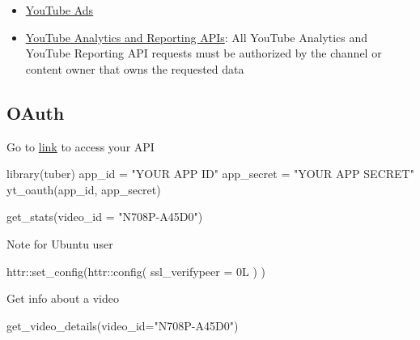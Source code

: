 \documentclass[
]{book}
\newenvironment{Shaded}{\begin{snugshade}}{\end{snugshade}}
\newcommand{\AttributeTok}[1]{\textcolor[rgb]{0.77,0.63,0.00}{#1}}
\newcommand{\FunctionTok}[1]{\textcolor[rgb]{0.00,0.00,0.00}{#1}}
\newcommand{\NormalTok}[1]{#1}
\newcommand{\OtherTok}[1]{\textcolor[rgb]{0.56,0.35,0.01}{#1}}
\newcommand{\SpecialCharTok}[1]{\textcolor[rgb]{0.00,0.00,0.00}{#1}}
\newcommand{\StringTok}[1]{\textcolor[rgb]{0.31,0.60,0.02}{#1}}
\providecommand{\tightlist}{%
  \setlength{\itemsep}{0pt}\setlength{\parskip}{0pt}}
\begin{document}
\begin{itemize}
\tightlist
\item
  \href{https://www.youtube.com/intl/en_us/ads/how-it-works/measure-your-results/}{YouTube Ads}\\
\item
  \href{https://developers.google.com/youtube/reporting}{YouTube Analytics and Reporting APIs}: All YouTube Analytics and
  YouTube Reporting API requests must be authorized by the channel or content owner that owns the requested data
\end{itemize}

\hypertarget{oauth}{%
\subsection{OAuth}\label{oauth}}

Go to \href{https://console.cloud.google.com/apis/api/youtube.googleapis.com}{link} to access your API

\begin{Shaded}
\begin{Highlighting}[]
\FunctionTok{library}\NormalTok{(tuber)}
\NormalTok{app\_id }\OtherTok{=} \StringTok{"YOUR APP ID"}
\NormalTok{app\_secret }\OtherTok{=} \StringTok{"YOUR APP SECRET"}
\FunctionTok{yt\_oauth}\NormalTok{(app\_id, app\_secret)}


\FunctionTok{get\_stats}\NormalTok{(}\AttributeTok{video\_id =} \StringTok{"N708P{-}A45D0"}\NormalTok{)}
\end{Highlighting}
\end{Shaded}

Note for Ubuntu user

\begin{Shaded}
\begin{Highlighting}[]
\NormalTok{httr}\SpecialCharTok{::}\FunctionTok{set\_config}\NormalTok{(httr}\SpecialCharTok{::}\FunctionTok{config}\NormalTok{( }\AttributeTok{ssl\_verifypeer =}\NormalTok{ 0L ) )}
\end{Highlighting}
\end{Shaded}

Get info about a video

\begin{Shaded}
\begin{Highlighting}[]
\FunctionTok{get\_video\_details}\NormalTok{(}\AttributeTok{video\_id=}\StringTok{"N708P{-}A45D0"}\NormalTok{)}
\end{Highlighting}
\end{Shaded}
\end{document}
